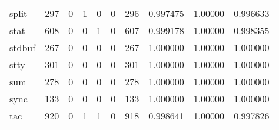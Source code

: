 \begin{longtable}{lrrrrrrrrr}
split     &                    297 &                                  0 &                                 1 &                                0 &                                 0 &                             296 &                                0.997475 &                                1.00000 &                             0.996633 \\
stat      &                    608 &                                  0 &                                 0 &                                1 &                                 0 &                             607 &                                0.999178 &                                1.00000 &                             0.998355 \\
stdbuf    &                    267 &                                  0 &                                 0 &                                0 &                                 0 &                             267 &                                1.000000 &                                1.00000 &                             1.000000 \\
stty      &                    301 &                                  0 &                                 0 &                                0 &                                 0 &                             301 &                                1.000000 &                                1.00000 &                             1.000000 \\
sum       &                    278 &                                  0 &                                 0 &                                0 &                                 0 &                             278 &                                1.000000 &                                1.00000 &                             1.000000 \\
sync      &                    133 &                                  0 &                                 0 &                                0 &                                 0 &                             133 &                                1.000000 &                                1.00000 &                             1.000000 \\
tac       &                    920 &                                  0 &                                 1 &                                1 &                                 0 &                             918 &                                0.998641 &                                1.00000 &                             0.997826 \\

\end{longtable}
